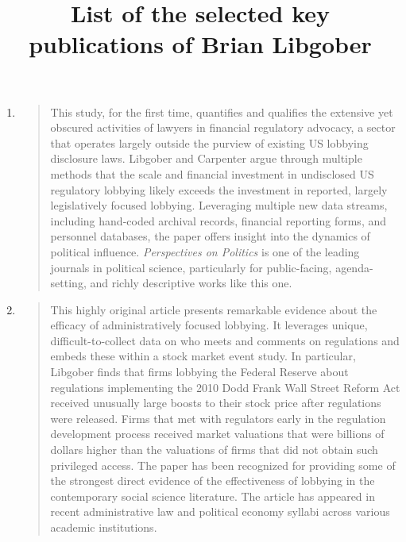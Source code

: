 \documentclass[12pt]{article}
\title{\large\bfseries List of the selected key publications of Brian Libgober}
\date{}
\begin{document}
\maketitle
\vspace{-20mm} %

\begin{enumerate}
\item {}

\begin{quote}
 This study, for the first time, quantifies and qualifies the extensive yet obscured activities of lawyers in financial regulatory advocacy, a sector that operates largely outside the purview of existing US lobbying disclosure laws. Libgober and Carpenter argue through multiple methods that the scale and financial investment in undisclosed US regulatory lobbying likely exceeds the investment in reported, largely legislatively focused lobbying. Leveraging multiple new data streams, including hand-coded archival records, financial reporting forms, and personnel databases, the paper offers insight into the dynamics of political influence. \emph{Perspectives on Politics} is one of the leading journals in political science, particularly for public-facing, agenda-setting, and richly descriptive works like this one. 
\end{quote}


\item {}

\begin{quote}
This highly original article presents remarkable evidence about the efficacy of administratively focused lobbying. It leverages unique, difficult-to-collect data on who meets and comments on regulations and embeds these within a stock market event study. In particular, Libgober finds that firms lobbying the Federal Reserve about regulations implementing the 2010 Dodd Frank Wall Street Reform Act received unusually large boosts to their stock price after regulations were released. Firms that met with regulators early in the regulation development process received market valuations that were billions of dollars higher than the valuations of firms that did not obtain such privileged access.  The paper has been recognized for providing some of the strongest direct evidence of the effectiveness of lobbying in the contemporary social science literature. The article has appeared in recent administrative law and political economy syllabi across various academic institutions. 
\end{quote}


\end{enumerate}
\end{document}
